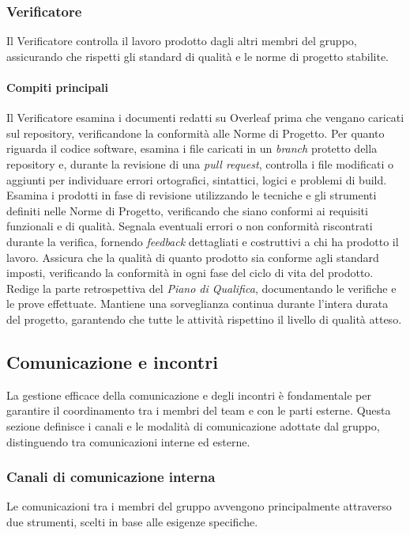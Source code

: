 \documentclass[a4paper, 11pt, oneside]{scrartcl} %
\begin{document}
\subsubsection{Verificatore}
Il Verificatore controlla il lavoro prodotto dagli altri membri del gruppo, assicurando che rispetti gli standard di qualità e le norme di progetto stabilite.

\paragraph{Compiti principali}
Il Verificatore esamina i documenti redatti su Overleaf prima che vengano caricati sul repository, verificandone la conformità alle Norme di Progetto.
Per quanto riguarda il codice software, esamina i file caricati in un \emph{branch{\scriptsize{}}} protetto della repository e, durante la revisione di una \emph{pull request{\scriptsize{}}}, controlla i file modificati o aggiunti per individuare errori ortografici, sintattici, logici e problemi di build.
Esamina i prodotti in fase di revisione utilizzando le tecniche e gli strumenti definiti nelle Norme di Progetto, verificando che siano conformi ai requisiti funzionali e di qualità.
Segnala eventuali errori o non conformità riscontrati durante la verifica, fornendo \emph{feedback}{\scriptsize{}} dettagliati e costruttivi a chi ha prodotto il lavoro.
Assicura che la qualità di quanto prodotto sia conforme agli standard imposti, verificando la conformità in ogni fase del ciclo di vita del prodotto.
Redige la parte retrospettiva del \emph{Piano di Qualifica{\scriptsize{}}}, documentando le verifiche e le prove effettuate.
Mantiene una sorveglianza continua durante l'intera durata del progetto, garantendo che tutte le attività rispettino il livello di qualità atteso.

\subsection{Comunicazione e incontri}
La gestione efficace della comunicazione e degli incontri è fondamentale per garantire il coordinamento tra i membri del team e con le parti esterne.
Questa sezione definisce i canali e le modalità di comunicazione adottate dal gruppo, distinguendo tra comunicazioni interne ed esterne.

\subsubsection{Canali di comunicazione interna}
Le comunicazioni tra i membri del gruppo avvengono principalmente attraverso due strumenti, scelti in base alle esigenze specifiche.
\end{document}

